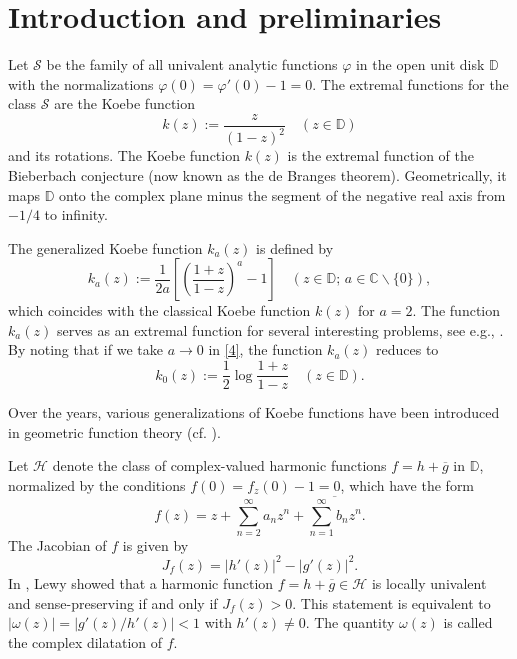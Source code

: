 \documentclass[11pt, reqno]{amsart}
\newtheorem{rem}{Remark}
\numberwithin{equation}{section}
\newcommand{\abs}[1]{\left\vert#1\right\vert}
\newcommand{\C}{\mbox{$\mathbb{C}$}}
\newcommand{\D}{\mbox{$\mathbb{D}$}}
\begin{document}
	
	\section{Introduction and preliminaries}
	Let $\mathcal S$ be the family of all univalent analytic functions $\varphi$ in the open unit disk $\D$ with the normalizations $\varphi(0)=\varphi'(0)-1=0$.
The extremal functions for the class $\mathcal S$ are the Koebe function
\begin{equation*}\label{3}
    k(z):=\dfrac{z}{(1-z)^2}\quad(z\in\D)
\end{equation*} and its rotations.
The Koebe function $k(z)$ is the extremal function of the Bieberbach conjecture (now known as the de Branges theorem).
Geometrically, it maps $\D$ onto the complex plane minus the segment of the negative real axis from $-1/4$ to infinity.


The generalized Koebe function $k_a(z)$ is defined by
\begin{equation}\label{4}
    k_a(z):=\dfrac{1}{2a}\left [\left(\dfrac{1+z}{1-z}\right)^a-1\right]\quad\left(z\in\D;\,a\in \C\backslash\{0\}\right),
\end{equation}
which coincides with the classical Koebe function $k(z)$ for $a=2$. 
The function $k_a(z)$ serves as an extremal function for several interesting problems, see e.g., \cite{ga,kt,m,nst,p}. 
By noting that if we take $a\rightarrow0$ in \eqref{4}, the function $k_a(z)$ reduces to 
\begin{equation*}\label{5}
    k_0(z):=\dfrac{1}{2}\log\dfrac{1+z}{1-z}\quad(z\in\D).
\end{equation*}

Over the years, various generalizations of Koebe functions have been introduced in geometric function theory (cf. \cite{dy,hm1,hrz,ma,pr}).	

Let $\mathcal H$ denote the class of complex-valued harmonic functions $f=h+\overline{g}$ in $\D$,
normalized by the conditions $f(0)=f_{z}(0)-1=0$, which have the
form
\begin{equation}\label{111}
f(z)=z+\sum_{n=2}^{\infty}a_nz^n+\overline{\sum_{n=1}^{\infty}b_nz^n}.
\end{equation}
 The Jacobian of $f$ is given by
\begin{equation*}\label{13}
    J_f(z)=|h'(z)|^2-|g'(z)|^2.
\end{equation*}
In \cite{l}, Lewy showed that a harmonic function $f=h+\overline{g}\in\mathcal H$ is locally univalent and sense-preserving if and only if $J_f(z)>0$. This statement is equivalent to $|\omega(z)|=\abs{g'(z)/h'(z)}<1$ with $h'(z)\neq 0$. The quantity $\omega(z)$ is called the complex dilatation of $f$.
\end{document}
